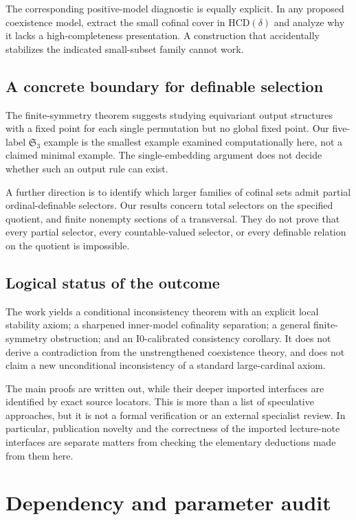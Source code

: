 \documentclass[11pt,letterpaper]{article}
\theoremstyle{definition}
\newcommand{\Izero}{\mathrm{I0}}
\newcommand{\HCD}{\mathrm{HCD}}
\newcommand{\Sym}{\mathfrak S}
\begin{document}
The corresponding positive-model diagnostic is equally explicit. In any proposed coexistence model, extract the small cofinal cover in $\HCD(\delta)$ and analyze why it lacks a high-completeness presentation. A construction that accidentally stabilizes the indicated small-subset family cannot work.

\subsection{A concrete boundary for definable selection}

The finite-symmetry theorem suggests studying equivariant output structures with a fixed point for each single permutation but no global fixed point. Our five-label $\Sym_3$ example is the smallest example examined computationally here, not a claimed minimal example. The single-embedding argument does not decide whether such an output rule can exist.

A further direction is to identify which larger families of cofinal sets admit partial ordinal-definable selectors. Our results concern total selectors on the specified quotient, and finite nonempty sections of a transversal. They do not prove that every partial selector, every countable-valued selector, or every definable relation on the quotient is impossible.

\subsection{Logical status of the outcome}

The work yields a conditional inconsistency theorem with an explicit local stability axiom; a sharpened inner-model cofinality separation; a general finite-symmetry obstruction; and an $\Izero$-calibrated consistency corollary. It does not derive a contradiction from the unstrengthened coexistence theory, and does not claim a new unconditional inconsistency of a standard large-cardinal axiom.

The main proofs are written out, while their deeper imported interfaces are identified by exact source locators. This is more than a list of speculative approaches, but it is not a formal verification or an external specialist review. In particular, publication novelty and the correctness of the imported lecture-note interfaces are separate matters from checking the elementary deductions made from them here.

\clearpage
\appendix
\section{Dependency and parameter audit}\label{app:audit}
\end{document}
